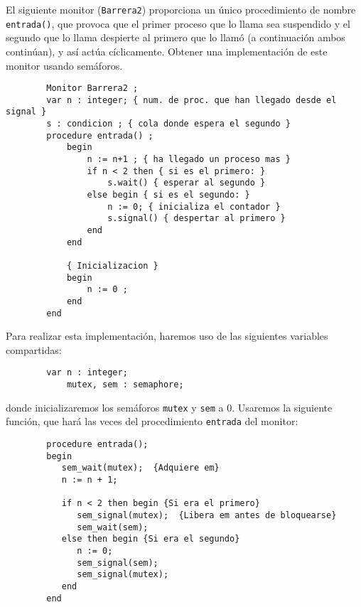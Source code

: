 \begin{ejercicio}
    El siguiente monitor (\verb|Barrera2|) proporciona un único procedimiento de nombre \verb|entrada()|, que provoca que el primer proceso que lo llama sea suspendido y el segundo que lo llama despierte al primero que lo llamó (a continuación ambos continúan), y así actúa cíclicamente.
    Obtener una implementación de este monitor usando semáforos.
    \begin{verbatim}
        Monitor Barrera2 ;
        var n : integer; { num. de proc. que han llegado desde el signal }
        s : condicion ; { cola donde espera el segundo }
        procedure entrada() ;
            begin
                n := n+1 ; { ha llegado un proceso mas }
                if n < 2 then { si es el primero: }
                    s.wait() { esperar al segundo }
                else begin { si es el segundo: }
                    n := 0; { inicializa el contador }
                    s.signal() { despertar al primero }
                end
            end

            { Inicializacion }
            begin
                n := 0 ;
            end
        end
    \end{verbatim}
    Para realizar esta implementación, haremos uso de las siguientes variables compartidas:
    \begin{verbatim}
        var n : integer;
            mutex, sem : semaphore;
    \end{verbatim}
    donde inicializaremos los semáforos \verb|mutex| y \verb|sem| a 0.
    Usaremos la siguiente función, que hará las veces del procedimiento \verb|entrada| del monitor:
    \begin{verbatim}
        procedure entrada();
        begin
           sem_wait(mutex);  {Adquiere em}
           n := n + 1;

           if n < 2 then begin {Si era el primero}
              sem_signal(mutex);  {Libera em antes de bloquearse}
              sem_wait(sem);
           else then begin {Si era el segundo}
              n := 0;
              sem_signal(sem);
              sem_signal(mutex);
           end
        end
    \end{verbatim}
\end{ejercicio}

